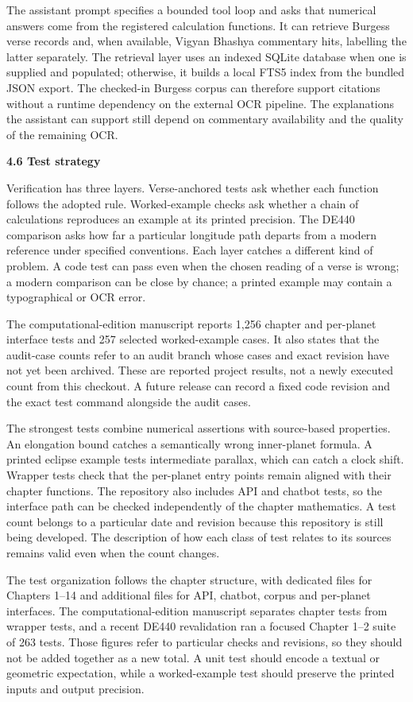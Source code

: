 \documentclass[
]{article}
\begin{document}
The assistant prompt specifies a bounded tool loop and asks that
numerical answers come from the registered calculation functions. It can
retrieve Burgess verse records and, when available, Vigyan Bhashya
commentary hits, labelling the latter separately. The retrieval layer
uses an indexed SQLite database when one is supplied and populated;
otherwise, it builds a local FTS5 index from the bundled JSON export.
The checked-in Burgess corpus can therefore support citations without a
runtime dependency on the external OCR pipeline. The explanations the
assistant can support still depend on commentary availability and the
quality of the remaining OCR.

\textbf{4.6 Test strategy}

Verification has three layers. Verse-anchored tests ask whether each
function follows the adopted rule. Worked-example checks ask whether a
chain of calculations reproduces an example at its printed precision.
The DE440 comparison asks how far a particular longitude path departs
from a modern reference under specified conventions. Each layer catches
a different kind of problem. A code test can pass even when the chosen
reading of a verse is wrong; a modern comparison can be close by chance;
a printed example may contain a typographical or OCR error.

The computational-edition manuscript reports 1,256 chapter and
per-planet interface tests and 257 selected worked-example cases. It
also states that the audit-case counts refer to an audit branch whose
cases and exact revision have not yet been archived. These are reported
project results, not a newly executed count from this checkout. A future
release can record a fixed code revision and the exact test command
alongside the audit cases.

The strongest tests combine numerical assertions with source-based
properties. An elongation bound catches a semantically wrong
inner-planet formula. A printed eclipse example tests intermediate
parallax, which can catch a clock shift. Wrapper tests check that the
per-planet entry points remain aligned with their chapter functions. The
repository also includes API and chatbot tests, so the interface path
can be checked independently of the chapter mathematics. A test count
belongs to a particular date and revision because this repository is
still being developed. The description of how each class of test relates
to its sources remains valid even when the count changes.

The test organization follows the chapter structure, with dedicated
files for Chapters 1--14 and additional files for API, chatbot, corpus
and per-planet interfaces. The computational-edition manuscript
separates chapter tests from wrapper tests, and a recent DE440
revalidation ran a focused Chapter 1--2 suite of 263 tests. Those
figures refer to particular checks and revisions, so they should not be
added together as a new total. A unit test should encode a textual or
geometric expectation, while a worked-example test should preserve the
printed inputs and output precision.
\end{document}
